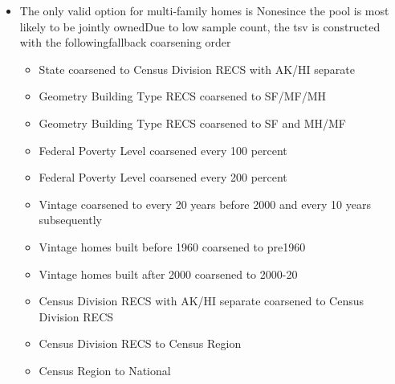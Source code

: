 \begin{itemize}
\item The only valid option for multi-family homes is Nonesince the pool is most likely to be jointly ownedDue to low sample count, the tsv is constructed with the followingfallback coarsening order
  \begin{itemize}
  \item State coarsened to Census Division RECS with AK/HI separate
  \item Geometry Building Type RECS coarsened to SF/MF/MH
  \item Geometry Building Type RECS coarsened to SF and MH/MF
  \item Federal Poverty Level coarsened every 100 percent
  \item Federal Poverty Level coarsened every 200 percent
  \item Vintage coarsened to every 20 years before 2000 and every 10 years subsequently
  \item Vintage homes built before 1960 coarsened to pre1960
  \item Vintage homes built after 2000 coarsened to 2000-20
  \item Census Division RECS with AK/HI separate coarsened to Census Division RECS
  \item Census Division RECS to Census Region
  \item Census Region to National
  \end{itemize}
\end{itemize}
